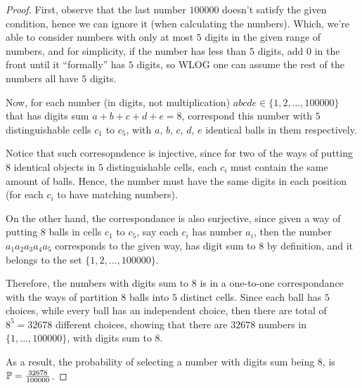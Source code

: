 \documentclass{article}
\begin{document}
\begin{proof}
    First, observe that the last number $100000$ doesn't satisfy the given condition, hence we can ignore it (when calculating the numbers). Which, we're able to consider numbers with only at most $5$ digits in the given range of numbers, and for simplicity, if the number has less than $5$ digits, add $0$ in the front until it ``formally'' has $5$ digits, so WLOG one can assume the rest of the numbers all have $5$ digits.

    \hfil

    Now, for each number (in digits, not multiplication) $abcde \in \{1,2,...,100000\}$ that has digits sum $a+b+c+d+e=8$, correspond this number with $5$ distinguishable cells $c_1$ to $c_5$, with $a$, $b$, $c$, $d$, $e$ identical balls in them respectively. 
    
    Notice that such corresopndence is injective, since for two of the ways of putting $8$ identical objects in $5$ distinguishable cells, each $c_i$ must contain the same amount of balls. Hence, the number must have the same digits in each position (for each $c_i$ to have matching numbers).

    On the other hand, the correspondance is also surjective, since given a way of putting $8$ balls in cells $c_1$ to $c_5$, say each $c_i$ has number $a_i$, then the number $a_1 a_2a_3a_4a_5$ corresponds to the given way, has digit sum to $8$ by definition, and it belongs to the set $\{1,2,...,100000\}$.

    \hfil

    Therefore, the numbers with digits sum to $8$ is in a one-to-one correspondance with the ways of partition $8$ balls into $5$ distinct cells. Since each ball has $5$ choices, while every ball has an independent choice, then there are total of $8^5=32678$ different choices, showing that there are $32678$ numbers in $\{1,...,100000\}$, with digits sum to $8$.

    As a result, the probability of selecting a number with digits sum being $8$, is $\mathbb{P} = \frac{32678}{100000}$.
\end{proof}
\end{document}
